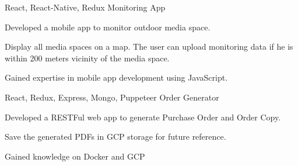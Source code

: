 

\begin{cventries}


  \cventry
  {React, React-Native, Redux} %
  {Monitoring App} %
  {} %
  {} %
  {
    \begin{cvitems} %
      \item {Developed a mobile app to monitor outdoor media space.}
      \item {Display all media spaces on a map. The user can upload monitoring data if he is within 200 meters vicinity of the media space.}
      \item {Gained expertise in mobile app development using JavaScript.}
    \end{cvitems}
  }


  \cventry
  {React, Redux, Express, Mongo, Puppeteer} %
  {Order Generator} %
  {} %
  {} %
  {
    \begin{cvitems} %
      \item {Developed a RESTFul web app to generate Purchase Order and Order Copy.}
      \item {Save the generated PDFs in GCP storage for future reference.}
      \item {Gained knowledge on Docker and GCP}
    \end{cvitems}
  }

\end{cventries}
